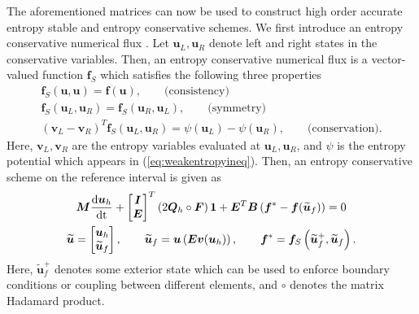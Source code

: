 \documentclass{svjour3}                     %
\renewcommand{\tilde}{\widetilde}
\newcommand{\td}[2]{\frac{{\rm d}#1}{{\rm d}{\rm #2}}}
\newcommand{\LRp}[1]{\left( #1 \right)}
\begin{document}
The aforementioned matrices can now be used to construct high order accurate entropy stable and entropy conservative schemes.  We first introduce an entropy conservative numerical flux \cite{tadmor1987numerical}.  Let $\bm{u}_L, \bm{u}_R$ denote left and right states in the conservative variables.  Then, an entropy conservative numerical flux is a vector-valued function $\bm{f}_S$ which satisfies the following three properties
\begin{gather*}
\bm{f}_S\LRp{\bm{u},\bm{u}} = \bm{f}(\bm{u}), \qquad \text{(consistency)}\\
\bm{f}_S\LRp{\bm{u}_L,\bm{u}_R} = \bm{f}_S(\bm{u}_R,\bm{u}_L), \qquad \text{(symmetry)}\\
\LRp{\bm{v}_L-\bm{v}_R}^T\bm{f}_S\LRp{\bm{u}_L,\bm{u}_R} = \psi(\bm{u}_L) - \psi(\bm{u}_R), \qquad \text{(conservation)}.
\end{gather*}
Here, $\bm{v}_L, \bm{v}_R$ are the entropy variables evaluated at $\bm{u}_L, \bm{u}_R$, and $\psi$ is the entropy potential which appears in (\ref{eq:weakentropyineq}).  Then, an entropy conservative scheme on the reference interval is given as
\begin{gather}
\bm{M}\td{\bm{u}_h}{t} + \begin{bmatrix} \bm{I} \\ \bm{E} \end{bmatrix}^T
\LRp{2\bm{Q}_h \circ \bm{F}}\bm{1} + \bm{E}^T\bm{B}\LRp{\bm{f}^*-\bm{f}(\tilde{\bm{u}}_f)} = 0 \label{eq:esdg1D}\\ 
\tilde{\bm{u}} = \begin{bmatrix}
\bm{u}_h\\
\tilde{\bm{u}}_f
\end{bmatrix}, \qquad \tilde{\bm{u}}_f = \bm{u}\LRp{\bm{E}\bm{v}(\bm{u}_h)}, \qquad \bm{f}^* = \bm{f}_S\LRp{\tilde{\bm{u}}_f^+,\tilde{\bm{u}}_f}.
\nonumber
\end{gather}
Here, $\tilde{\bm{u}}_f^+$ denotes some exterior state which can be used to enforce boundary conditions or coupling between different elements, and $\circ$ denotes the matrix Hadamard product.  
\end{document}

